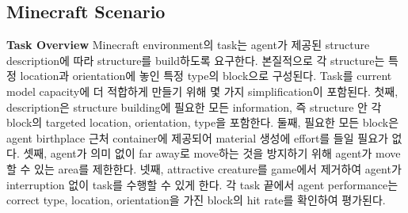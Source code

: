 \subsection{Minecraft Scenario}
\label{app: minecraft-scenario}
\textbf{Task Overview}
Minecraft environment의 task는 agent가 제공된 structure description에 따라 structure를 build하도록 요구한다. 본질적으로 각 structure는 특정 location과 orientation에 놓인 특정 type의 block으로 구성된다. Task를 current model capacity에 더 적합하게 만들기 위해 몇 가지 simplification이 포함된다. 첫째, description은 structure building에 필요한 모든 information, 즉 structure 안 각 block의 targeted location, orientation, type을 포함한다. 둘째, 필요한 모든 block은 agent birthplace 근처 container에 제공되어 material 생성에 effort를 들일 필요가 없다. 셋째, agent가 의미 없이 far away로 move하는 것을 방지하기 위해 agent가 move할 수 있는 area를 제한한다. 넷째, attractive creature를 game에서 제거하여 agent가 interruption 없이 task를 수행할 수 있게 한다. 각 task 끝에서 agent performance는 correct type, location, orientation을 가진 block의 hit rate를 확인하여 평가된다.

